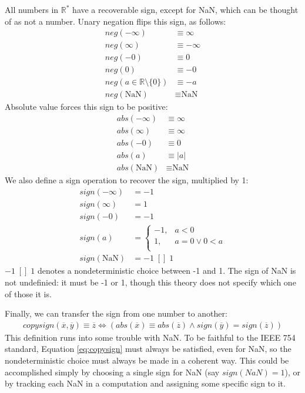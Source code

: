 \documentclass[letterpaper,10pt]{article}
\newcommand{\NaN}{\text{NaN}}
\begin{document}
 All numbers in $\mathbb{R}^*$ have a recoverable sign, except for NaN, which can be thought of as not a number. Unary negation flips this sign, as follows:
\begin{align}
 neg(-\infty) &\equiv \infty \\
 neg(\infty) &\equiv -\infty \\
 neg(-0) &\equiv 0 \\
 neg(0) &\equiv -0 \\
 neg(a \in \mathbb{R} \setminus \{0\}) &\equiv -a \\
 neg(\NaN) &\equiv \NaN
\end{align}
 Absolute value forces this sign to be positive:
\begin{align}
 abs(-\infty) &\equiv \infty \\
 abs(\infty) &\equiv \infty \\
 abs(-0) &\equiv 0 \\
 abs(a) &\equiv |a| \\
 abs(\NaN) &\equiv \NaN
\end{align}
 We also define a sign operation to recover the sign, multiplied by 1:
\begin{align}
 sign(-\infty) &= -1 \\
 sign(\infty) &= 1 \\
 sign(-0) &= -1 \\
 sign(a) &=
 \begin{cases}
  -1, &a < 0 \\
  1,  &a = 0 \lor 0 < a \\
 \end{cases}\\
 sign(\NaN) &= -1 \;[]\; 1
\end{align}
 $-1 \;[]\; 1$ denotes a nondeterministic choice between -1 and 1. The sign of NaN is not undefinied: it must be -1 or 1, though this theory does not specify which one of those it is.
 
 Finally, we can transfer the sign from one number to another:
\begin{align}
 copysign(\overline{x}, \overline{y}) \equiv \overline{z} \iff (abs(\overline{x}) \equiv abs(\overline{z}) \land sign(\overline{y}) = sign(\overline{z})) \label{eq:copysign}
\end{align}
This definition runs into some trouble with NaN. To be faithful to the IEEE 754 standard, Equation \ref{eq:copysign} must always be satisfied, even for NaN, so the nondeterministic choice must always be made in a coherent way. This could be accomplished simply by choosing a single sign for NaN (say $sign(NaN) = 1$), or by tracking each NaN in a computation and assigning some specific sign to it.
\end{document}
